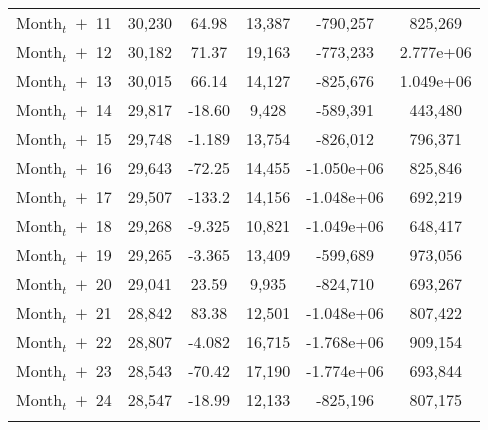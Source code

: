 \begin{table}[H]
\begin{center}
\begin{tabular}{lccccc}
 Month$_t$\ $+$\ 11& 30,230 & 64.98 & 13,387 & -790,257 & 825,269 \\

Month$_t$\ $+$\ 12 & 30,182 & 71.37 & 19,163 & -773,233 & 2.777e+06 \\

 Month$_t$\ $+$\ 13& 30,015 & 66.14 & 14,127 & -825,676 & 1.049e+06 \\

 Month$_t$\ $+$\ 14 & 29,817 & -18.60 & 9,428 & -589,391 & 443,480 \\

Month$_t$\ $+$\ 15  & 29,748 & -1.189 & 13,754 & -826,012 & 796,371 \\

 Month$_t$\ $+$\ 16 & 29,643 & -72.25 & 14,455 & -1.050e+06 & 825,846 \\
 Month$_t$\ $+$\ 17 & 29,507 & -133.2 & 14,156 & -1.048e+06 & 692,219 \\
 Month$_t$\ $+$\ 18& 29,268 & -9.325 & 10,821 & -1.049e+06 & 648,417 \\
 Month$_t$\ $+$\ 19& 29,265 & -3.365 & 13,409 & -599,689 & 973,056 \\
 Month$_t$\ $+$\ 20& 29,041 & 23.59 & 9,935 & -824,710 & 693,267 \\
 Month$_t$\ $+$\ 21& 28,842 & 83.38 & 12,501 & -1.048e+06 & 807,422 \\
 Month$_t$\ $+$\ 22& 28,807 & -4.082 & 16,715 & -1.768e+06 & 909,154 \\
 Month$_t$\ $+$\ 23& 28,543 & -70.42 & 17,190 & -1.774e+06 & 693,844 \\
Month$_t$\ $+$\ 24& 28,547 & -18.99 & 12,133 & -825,196 & 807,175 \\
 & \begin{footnotesize}\end{footnotesize} & \begin{footnotesize}\end{footnotesize} & \begin{footnotesize}\end{footnotesize} & \begin{footnotesize}\end{footnotesize} & \begin{footnotesize}\end{footnotesize} \\ \hline
\end{tabular}
\end{center}
\end{table}







 




 

 

 
 



 
 
 
 
 
